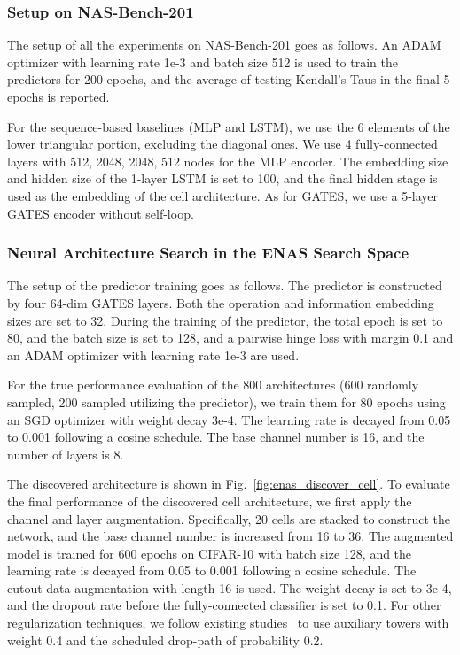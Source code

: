 \subsubsection{Setup on NAS-Bench-201}
The setup of all the experiments on NAS-Bench-201 goes as follows. An ADAM optimizer with learning rate 1e-3 and batch size 512 is used to train the predictors for 200 epochs, and the average of testing Kendall's Taus in the final 5 epochs is reported.

For the sequence-based baselines (MLP and LSTM), we use the 6 elements of the lower triangular portion, excluding the diagonal ones. We use 4 fully-connected layers with 512, 2048, 2048, 512 nodes for the MLP encoder. The embedding size and hidden size of the 1-layer LSTM is set to 100, and the final hidden stage is used as the embedding of the cell architecture. As for GATES, we use a 5-layer GATES encoder without self-loop.


\subsubsection{Neural Architecture Search in the ENAS Search Space}


The setup of the predictor training goes as follows. The predictor is constructed by four 64-dim GATES layers. Both the operation and information embedding sizes are set to 32. During the training of the predictor, the total epoch is set to 80, and the batch size is set to 128, and a pairwise hinge loss with margin 0.1 and an ADAM optimizer with learning rate 1e-3 are used.

For the true performance evaluation of the 800 architectures (600 randomly sampled, 200 sampled utilizing the predictor), we train them for 80 epochs using an SGD optimizer with weight decay 3e-4. The learning rate is decayed from 0.05 to 0.001 following a cosine schedule. The base channel number is 16, and the number of layers is 8.

The discovered architecture is shown in Fig.~\ref{fig:enas_discover_cell}. To evaluate the final performance of the discovered cell architecture, we first apply the channel and layer augmentation. Specifically, 20 cells are stacked to construct the network, and the base channel number is increased from 16 to 36. The augmented model is trained for 600 epochs on CIFAR-10 with batch size 128, and the learning rate is decayed from 0.05 to 0.001 following a cosine schedule. The cutout data augmentation with length 16 is used. The weight decay is set to 3e-4, and the dropout rate before the fully-connected classifier is set to 0.1. For other regularization techniques, we follow existing studies~\cite{zoph2018learning,darts} to use auxiliary towers with weight 0.4 and the scheduled drop-path of probability 0.2. 



